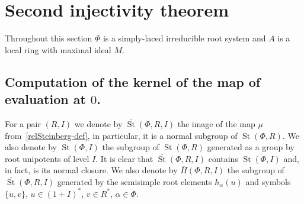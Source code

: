 \documentclass[oneside, 8pt]{amsart}
\theoremstyle{remark}
\theoremstyle{definition}
\DeclareMathOperator{\St}{St}
\numberwithin{equation}{section}
\begin{document}
\section{Second injectivity theorem}
\begin{comment} 
First of all, set $\widetilde{V} = \overline{G}^{\geq 0}_M \times G^{\leq 0} \times (1 + M)^*$
 and consider it as a pointed set, i.\,e. ignore its structure of the group but retain $\widetilde{v_0} = (1, 1, 1)$ as a choice of a basepoint.
We let the group $\St(\Phi, R, M)$ act on $\widetilde{V}$ via the formula 
 $h \cdot (\overline{g}^+, g^-, u) = (\overline{g}^+ \cdot j_+i_+(h), i_-(h)^{-1}\cdot g^-, u)$.
Denote by $V$ the set of orbits of this action with the fixed basepoint $v_0 = O(\widetilde{v}_0)$.
We will use the notation $[\overline{g}^+, g^-, u]$ as a shorthand for $O(\overline{g}^+, g^-, u)$.

It is obvious that the map $\widetilde{p} \colon \widetilde{V} \to \St(\Phi, R[t, t^{-1}])$ given by 
 \[(\overline{g}^+, g^-, u) \mapsto \overline{g}^+ \cdot j_-(g^-) \cdot \{t, u\}\]
 is constant on the orbits of the above action
  and therefore gives rise to a well-defined map $p \colon V \to \St(\Phi, R[t, t^{-1}])$ of pointed sets.

We will construct an action of $\St(\Phi, B)$ on the set $V$ with the following additional properties:
\begin{enumerate}
\item for $g^- \in \St(\Phi, R[t^{-1}])$ one has $\varphi(g^-) \cdot v_0 = [1, g^-, 1]$, where $\varphi$ is the canonical map
  $\St(\Phi, R[t^{-1}]) \to \St(\Phi, B)$ induced by the embedding $R[t^{-1}] \to B$.
\item for $g \in \St(\Phi, B)$ the element $p(g \cdot v_0)$ coincides with the canonical image of $g$ in $\St(\Phi, R[t, t^{-1}])$; 
\end{enumerate} \end{comment}

Throughout this section $\Phi$ is a simply-laced irreducible root system and $A$ is a local ring with maximal ideal $M$.

\subsection{Computation of the kernel of the map of evaluation at $0$.}
For a pair $(R, I)$ we denote by $\overline{\St}(\Phi, R, I)$ the image of the map $\mu$ from~\eqref{relSteinberg-def}, in particular, it is a normal subgroup of $\St(\Phi, R)$.
We also denote by $\St(\Phi, I)$ the subgroup of $\St(\Phi, R)$ generated as a group by root unipotents of level $I$.
It is clear that $\overline{\St}(\Phi, R, I)$ contains $\St(\Phi, I)$ and, in fact, is its normal closure.
We also denote by $\overline{H}(\Phi, R, I)$ the subgroup of $\overline{\St}(\Phi, R, I)$ generated by the semisimple root elements $h_\alpha(u)$ and symbols $\{u, v\}$, $u \in (1+I)^*$, $v \in R^*$, $\alpha\in \Phi$.
\end{document}

